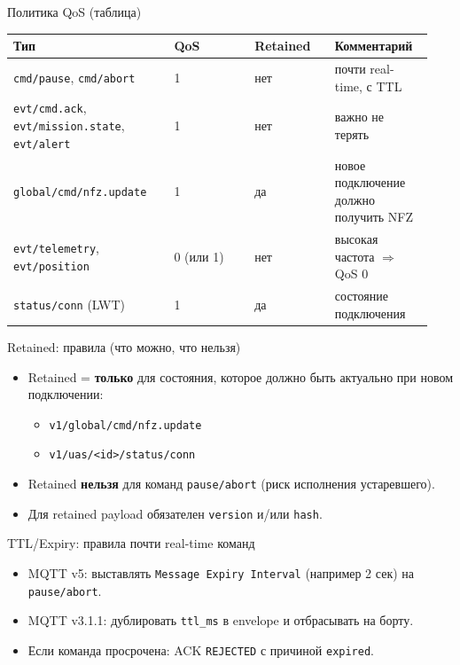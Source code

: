 \documentclass[aspectratio=169]{beamer}
\begin{document}
\begin{frame}[fragile]{Политика QoS (таблица)}
\small
\begin{tabular}{@{}p{0.36\linewidth}p{0.18\linewidth}p{0.18\linewidth}p{0.22\linewidth}@{}}
\toprule
Тип & QoS & Retained & Комментарий \\
\midrule
\texttt{cmd/pause}, \texttt{cmd/abort} & 1 & нет & почти real-time, с TTL \\
\texttt{evt/cmd.ack}, \texttt{evt/mission.state}, \texttt{evt/alert} & 1 & нет & важно не терять \\
\texttt{global/cmd/nfz.update} & 1 & да & новое подключение должно получить NFZ \\
\texttt{evt/telemetry}, \texttt{evt/position} & 0 (или 1) & нет & высокая частота $\Rightarrow$ QoS 0 \\
\texttt{status/conn} (LWT) & 1 & да & состояние подключения \\
\bottomrule
\end{tabular}
\end{frame}

\begin{frame}[fragile]{Retained: правила (что можно, что нельзя)}
\begin{itemize}
  \item Retained = \textbf{только} для состояния, которое должно быть актуально при новом подключении:
  \begin{itemize}
    \item \texttt{v1/global/cmd/nfz.update}
    \item \texttt{v1/uas/<id>/status/conn}
  \end{itemize}
  \item Retained \textbf{нельзя} для команд \texttt{pause/abort} (риск исполнения устаревшего).
  \item Для retained payload обязателен \texttt{version} и/или \texttt{hash}.
\end{itemize}
\end{frame}

\begin{frame}[fragile]{TTL/Expiry: правила почти real-time команд}
\begin{itemize}
  \item MQTT v5: выставлять \texttt{Message Expiry Interval} (например 2 сек) на \texttt{pause/abort}.
  \item MQTT v3.1.1: дублировать \texttt{ttl\_ms} в envelope и отбрасывать на борту.
  \item Если команда просрочена: ACK \texttt{REJECTED} с причиной \texttt{expired}.
\end{itemize}
\end{frame}
\end{document}

